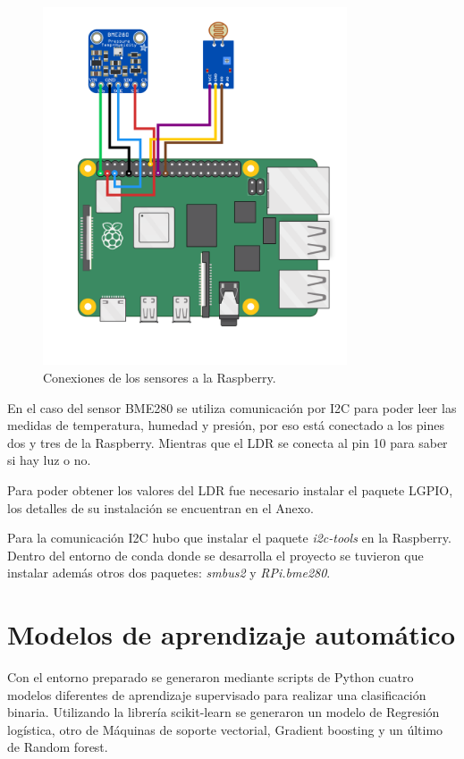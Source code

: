 \documentclass[a4paper, 12pt]{book}
\begin{document}
\begin{figure}[h!]
  \centering
  \includegraphics[width=9cm, keepaspectratio]{img/circuito.png}
  \caption{Conexiones de los sensores a la Raspberry.}\label{fig:circuito}
\end{figure}

En el caso del sensor BME280 se utiliza comunicación por I2C para poder leer las medidas de temperatura, humedad y presión, por eso está conectado a los pines dos y tres de la Raspberry. Mientras que el LDR se conecta al pin 10 para saber si hay luz o no.

Para poder obtener los valores del LDR fue necesario instalar el paquete LGPIO, los detalles de su instalación se encuentran en el Anexo.

Para la comunicación I2C hubo que instalar el paquete \textit{i2c-tools} en la Raspberry. Dentro del entorno de conda donde se desarrolla el proyecto se tuvieron que instalar además otros dos paquetes: \textit{smbus2} y \textit{RPi.bme280}.

\section{Modelos de aprendizaje automático}

Con el entorno preparado se generaron mediante scripts de Python cuatro modelos diferentes de aprendizaje supervisado para realizar una clasificación binaria. Utilizando la librería scikit-learn se generaron un modelo de Regresión logística, otro de Máquinas de soporte vectorial, Gradient boosting y un último de Random forest.
\end{document}
